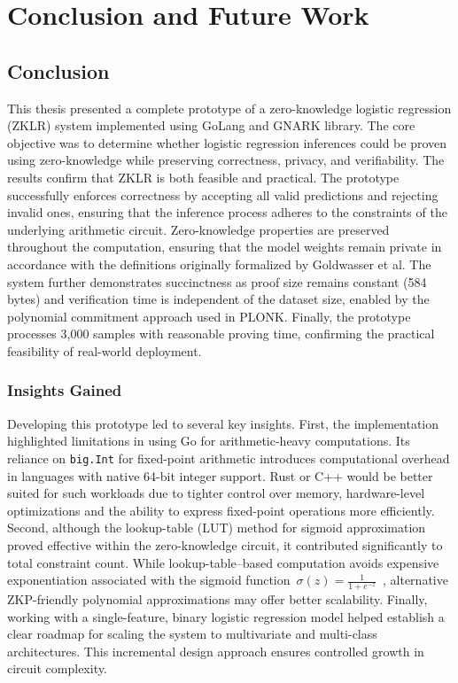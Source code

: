 \chapter{Conclusion and Future Work}

\section{Conclusion}

This thesis presented a complete prototype of a zero-knowledge logistic regression (ZKLR) system implemented using GoLang and GNARK library. The core objective was to determine whether logistic regression inferences could be proven using zero-knowledge while preserving correctness, privacy, and verifiability. The results confirm that ZKLR is both feasible and practical. The prototype successfully enforces correctness by accepting all valid predictions and rejecting invalid ones, ensuring that the inference process adheres to the constraints of the underlying arithmetic circuit. Zero-knowledge properties are preserved throughout the computation, ensuring that the model weights remain private in accordance with the definitions originally formalized by Goldwasser et al. The system further demonstrates succinctness as proof size remains constant (584 bytes) and verification time is independent of the dataset size, enabled by the polynomial commitment approach used in PLONK. Finally, the prototype processes 3,000 samples with reasonable proving time, confirming the practical feasibility of real-world deployment.

\subsection{Insights Gained}

Developing this prototype led to several key insights. First, the implementation highlighted limitations in using Go for arithmetic-heavy computations. Its reliance on \texttt{big.Int} for fixed-point arithmetic introduces computational overhead in languages with native 64-bit integer support. Rust or C++ would be better suited for such workloads due to tighter control over memory, hardware-level optimizations and the ability to express fixed-point operations more efficiently. Second, although the lookup-table (LUT) method for sigmoid approximation proved effective within the zero-knowledge circuit, it contributed significantly to total constraint count. While lookup-table–based computation avoids expensive exponentiation associated with the sigmoid function~$\sigma(z) = \tfrac{1}{1+e^{-z}}$~, alternative ZKP-friendly polynomial approximations may offer better scalability. Finally, working with a single-feature, binary logistic regression model helped establish a clear roadmap for scaling the system to multivariate and multi-class architectures. This incremental design approach ensures controlled growth in circuit complexity.

